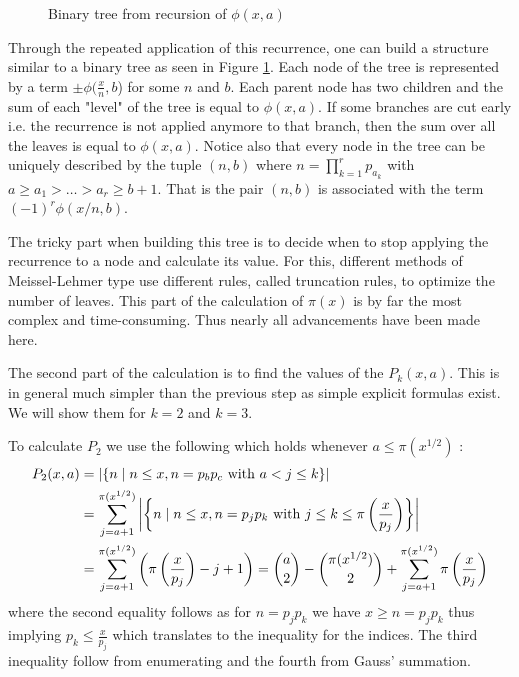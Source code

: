 \begin{figure}[htpb]
	\centering
	\caption[skip=0pt]{Binary tree from recursion of $\phi(x,a)$}
	\label{fig:binaryTree}
\end{figure}
Through the repeated application of this recurrence, one can  build a structure similar to a binary tree as seen in Figure \ref{fig:binaryTree}.
Each node of the tree is represented by a term $\pm \phi(\frac{x}{n},b$) for some $n$ and $b$. 
Each parent node has two children and the sum of each "level" of the tree
is equal to $\phi(x,a)$. If some branches are cut early i.e. the recurrence is not applied anymore to that branch, then the sum over all the leaves is equal to $\phi(x,a)$.
Notice also that every node in the tree can be uniquely described by the tuple $(n,b)$ where $n = \prod_{k=1}^{r} p_{a_{k}}$ with 
$a \geq a_1 > \ldots > a_{r} \geq b +1$. That is the pair $(n,b)$ is associated with the term $(-1)^{r} \phi(x / n , b)$.

The tricky part when building this tree is to decide when to stop applying the recurrence to a node and calculate its value.
For this, different methods of Meissel-Lehmer type use different rules, called truncation rules, to optimize the number of leaves.
This part of the calculation of $\pi(x)$ is by far the most complex and time-consuming. Thus nearly all advancements have been made here.

The second part of the calculation is to find the values of the $P_{k}(x,a)$.
This is in general much simpler than the previous step as simple explicit formulas exist.
We will show them for $k=2$ and $k=3$.

To calculate $P_2$ we use the following which holds whenever $a \leq \pi(x^{1 / 2})$ :
\begin{align*}
	P_2(x,a) &= \abs{\{n \mid n \leq x, n = p_{b} p_{c} \text{ with } a < j \leq k\} }\\
			 &=  \sum_{j=a+1}^{\pi(x^{1 / 2})} \abs{\left\{ n \mid n \leq x, n = p_{j} p_{k} \text{ with } j \leq k \leq \pi\left( \frac{x}{p_{j}} \right)  \right\} } \\
			 &= \sum_{j = a+1}^{\pi(x^{1 / 2})} \left( \pi\left(\frac{x}{p_{j}}\right) -j + 1 \right)  =
			 \binom{a}{2} - \binom{\pi(x^{1/ 2})}{2} + \sum_{j=a+1}^{\pi(x^{1 / 2})} \pi\left( \frac{x}{p_{j}} \right)
\end{align*}
where the second equality follows as for $n = p_{j} p_{k}$ we have $x \geq n = p_{j} p_{k}$ thus implying $p_{k} \leq \frac{x}{p_{j}}$
which translates to the inequality for the indices.
The third inequality follow from enumerating and the fourth from Gauss' summation.

